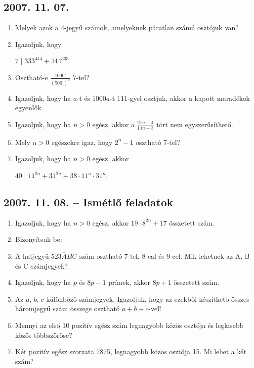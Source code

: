 \subsection*{2007. 11. 07.}
\begin{enumerate}
\item Melyek azok a 4-jegyű számok, amelyeknek páratlan számú osztójuk van?
\item Igazoljuk, hogy

$7 \mid 333^{444}+444^{333}$.
\item Osztható-e $\displaystyle{\frac{1000!}{(500!)^2}}$ 7-tel?
\item Igazoljuk, hogy ha $a$-t és $1000a$-t 111-gyel osztjuk, akkor a kapott maradékok egyenlők.
\item Igazoljuk, hogy ha $n>0$ egész, akkor a $\displaystyle{\frac{21n+4}{14n+3}}$ tört nem egyszerűsíthető.
\item Mely $n>0$ egészekre igaz, hogy $2^n-1$ osztható 7-tel?
\item Igazoljuk, hogy ha $n>0$ egész, akkor

$40 \mid 11^{2n}+31^{2n}+38\cdot11^n\cdot31^n$.
\end{enumerate}


\subsection*{2007. 11. 08. -- Ismétlő feladatok}
\begin{enumerate}
\item Igazoljuk, hogy ha $n>0$ egész, akkor $19\cdot8^{2n}+17$ összetett szám.
\item Bizonyítsuk be:
\item A hatjegyű $\overline{523ABC}$ szám osztható 7-tel, 8-cal és 9-cel. Mik lehetnek az A, B és C számjegyek?
\item Igazoljuk, hogy ha $p$ és $8p-1$ prímek, akkor $8p+1$ összetett szám.
\item Az $a$, $b$, $c$ különböző számjegyek. Igazoljuk, hogy az ezekből készíthető összes háromjegyű szám összege osztható $a+b+c$-vel!
\item Mennyi az első 10 pozitív egész szám legnagyobb közös osztója és legkisebb közös többszöröse?
\item Két pozitív egész szorzata 7875, legnagyobb közös osztója 15. Mi lehet a két szám?
\end{enumerate}


